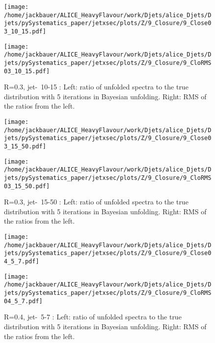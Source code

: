 \begin{figure}
\centering
\begin{minipage}{.5\textwidth}
  \centering
  \texttt{[image: /home/jackbauer/ALICE\_HeavyFlavour/work/Djets/alice\_Djets/Djets/pySystematics\_paper/jetxsec/plots/Z/9\_Closure/9\_Close03\_10\_15.pdf]}
\end{minipage}%
\begin{minipage}{.5\textwidth}
  \centering
  \texttt{[image: /home/jackbauer/ALICE\_HeavyFlavour/work/Djets/alice\_Djets/Djets/pySystematics\_paper/jetxsec/plots/Z/9\_Closure/9\_CloRMS03\_10\_15.pdf]}
\end{minipage}
  \caption{R=0.3, jet-\pt\ 10-15 \GeVc: Left: ratio of unfolded spectra to the true distribution with 5 iterations in Bayesian unfolding. Right: RMS of the ratios from the left.}
  \label{fig:UnfClosZchR03_10_15}
\end{figure}
\begin{figure}
\centering
\begin{minipage}{.5\textwidth}
  \centering
  \texttt{[image: /home/jackbauer/ALICE\_HeavyFlavour/work/Djets/alice\_Djets/Djets/pySystematics\_paper/jetxsec/plots/Z/9\_Closure/9\_Close03\_15\_50.pdf]}
\end{minipage}%
\begin{minipage}{.5\textwidth}
  \centering
  \texttt{[image: /home/jackbauer/ALICE\_HeavyFlavour/work/Djets/alice\_Djets/Djets/pySystematics\_paper/jetxsec/plots/Z/9\_Closure/9\_CloRMS03\_15\_50.pdf]}
\end{minipage}
  \caption{R=0.3, jet-\pt\ 15-50 \GeVc: Left: ratio of unfolded spectra to the true distribution with 5 iterations in Bayesian unfolding. Right: RMS of the ratios from the left.}
  \label{fig:UnfClosZchR03_15_50}
\end{figure}
\begin{figure}
\centering
\begin{minipage}{.5\textwidth}
  \centering
  \texttt{[image: /home/jackbauer/ALICE\_HeavyFlavour/work/Djets/alice\_Djets/Djets/pySystematics\_paper/jetxsec/plots/Z/9\_Closure/9\_Close04\_5\_7.pdf]}
\end{minipage}%
\begin{minipage}{.5\textwidth}
  \centering
  \texttt{[image: /home/jackbauer/ALICE\_HeavyFlavour/work/Djets/alice\_Djets/Djets/pySystematics\_paper/jetxsec/plots/Z/9\_Closure/9\_CloRMS04\_5\_7.pdf]}
\end{minipage}
  \caption{R=0.4, jet-\pt\ 5-7 \GeVc: Left: ratio of unfolded spectra to the true distribution with 5 iterations in Bayesian unfolding. Right: RMS of the ratios from the left.}
  \label{fig:UnfClosZchR04_5_7}
\end{figure}
